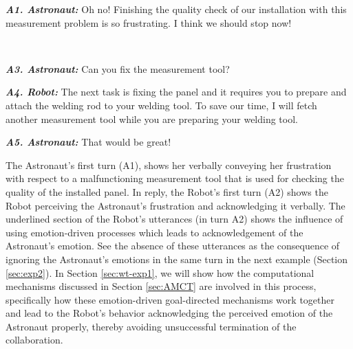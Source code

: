 \begin{description}
  \item \textit{\textbf{A1. Astronaut:}} Oh no! Finishing the quality check of
  our installation with this measurement problem is so frustrating. I think we
  should stop now!\\

  \item {}\\
  
  \item \textit{\textbf{A3. Astronaut:}} Can you fix the measurement tool?\\

  \item \textit{\textbf{A4. Robot:}} The next task is fixing the panel and it
  requires you to prepare and attach the welding rod to your welding tool. To
  save our time, I will fetch another measurement tool while you are preparing
  your welding tool.\\

  \item \textit{\textbf{A5. Astronaut:}} That would be great!
  
\end{description}

The Astronaut's first turn (A1), shows her verbally conveying her frustration
with respect to a malfunctioning measurement tool that is used for checking the
quality of the installed panel. In reply, the Robot's first turn (A2) shows the
Robot perceiving the Astronaut's frustration and acknowledging it verbally. The
underlined section of the Robot's utterances (in turn A2) shows the influence of
using emotion-driven processes which leads to acknowledgement of the Astronaut's
emotion. See the absence of these utterances as the consequence of ignoring the
Astronaut's emotions in the same turn in the next example (Section
\ref{sec:exp2}). In Section \ref{sec:wt-exp1}, we will show how the
computational mechanisms discussed in Section \ref{sec:AMCT} are involved in
this process, specifically how these emotion-driven goal-directed mechanisms
work together and lead to the Robot's behavior acknowledging the perceived
emotion of the Astronaut properly, thereby avoiding unsuccessful termination of
the collaboration.

